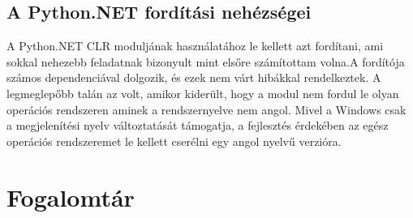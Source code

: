 \subsection{A Python.NET fordítási nehézségei}
A Python.NET CLR moduljának használatához le kellett azt fordítani, ami sokkal nehezebb feladatnak bizonyult mint elsőre számítottam volna.A fordítója számos dependenciával dolgozik, és ezek nem várt hibákkal rendelkeztek. A legmeglepőbb talán az volt, amikor kiderült, hogy a modul nem fordul le olyan operációs rendszeren aminek a rendszernyelve nem angol. Mivel a Windows csak a megjelenítési nyelv változtatását támogatja, a fejlesztés érdekében az egész operációs rendszeremet le kellett cserélni egy angol nyelvű verzióra.



\section{Fogalomtár}
\label{sec:definitions}

